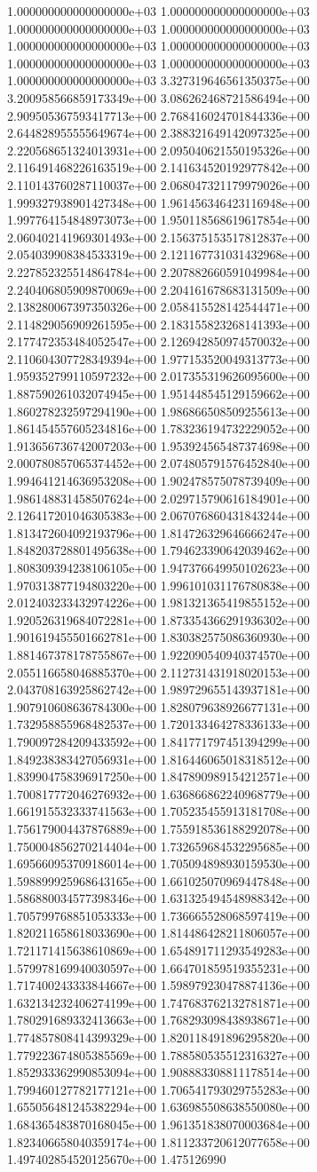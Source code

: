 1.000000000000000000e+03	1.000000000000000000e+03	1.000000000000000000e+03	1.000000000000000000e+03	1.000000000000000000e+03	1.000000000000000000e+03	1.000000000000000000e+03	1.000000000000000000e+03	1.000000000000000000e+03	3.327319646561350375e+00	3.200958566859173349e+00	3.086262468721586494e+00	2.909505367593417713e+00	2.768416024701844336e+00	2.644828955555649674e+00	2.388321649142097325e+00	2.220568651324013931e+00	2.095040621550195326e+00	2.116491468226163519e+00	2.141634520192977842e+00	2.110143760287110037e+00	2.068047321179979026e+00	1.999327938901427348e+00	1.961456346423116948e+00	1.997764154848973073e+00	1.950118568619617854e+00	2.060402141969301493e+00	2.156375153517812837e+00	2.054039908384533319e+00	2.121167731031432968e+00	2.227852325514864784e+00	2.207882660591049984e+00	2.240406805909870069e+00	2.204161678683131509e+00	2.138280067397350326e+00	2.058415528142544471e+00	2.114829056909261595e+00	2.183155823268141393e+00	2.177472353484052547e+00	2.126942850974570032e+00	2.110604307728349394e+00	1.977153520049313773e+00	1.959352799110597232e+00	2.017355319626095600e+00	1.887590261032074945e+00	1.951448545129159662e+00	1.860278232597294190e+00	1.986866508509255613e+00	1.861454557605234816e+00	1.783236194732229052e+00	1.913656736742007203e+00	1.953924565487374698e+00	2.000780857065374452e+00	2.074805791576452840e+00	1.994641214636953208e+00	1.902478575078739409e+00	1.986148831458507624e+00	2.029715790616184901e+00	2.126417201046305383e+00	2.067076860431843244e+00	1.813472604092193796e+00	1.814726329646666247e+00	1.848203728801495638e+00	1.794623390642039462e+00	1.808309394238106105e+00	1.947376649950102623e+00	1.970313877194803220e+00	1.996101031176780838e+00	2.012403233432974226e+00	1.981321365419855152e+00	1.920526319684072281e+00	1.873354366291936302e+00	1.901619455501662781e+00	1.830382575086360930e+00	1.881467378178755867e+00	1.922090540940374570e+00	2.055116658046885370e+00	2.112731431918020153e+00	2.043708163925862742e+00	1.989729655143937181e+00	1.907910608636784300e+00	1.828079638926677131e+00	1.732958855968482537e+00	1.720133464278336133e+00	1.790097284209433592e+00	1.841771797451394299e+00	1.849238383427056931e+00	1.816446065018318512e+00	1.839904758396917250e+00	1.847890989154212571e+00	1.700817772046276932e+00	1.636866862240968779e+00	1.661915532333741563e+00	1.705235455913181708e+00	1.756179004437876889e+00	1.755918536188292078e+00	1.750004856270214404e+00	1.732659684532295685e+00	1.695660953709186014e+00	1.705094898930159530e+00	1.598899925968643165e+00	1.661025070969447848e+00	1.586880034577398346e+00	1.631325494548988342e+00	1.705799768851053333e+00	1.736665528068597419e+00	1.820211658618033690e+00	1.814486428211806057e+00	1.721171415638610869e+00	1.654891711293549283e+00	1.579978169940030597e+00	1.664701859519355231e+00	1.717400243333844667e+00	1.598979230478874136e+00	1.632134232406274199e+00	1.747683762132781871e+00	1.780291689332413663e+00	1.768293098438938671e+00	1.774857808414399329e+00	1.820118491896295820e+00	1.779223674805385569e+00	1.788580535512316327e+00	1.852933362990853094e+00	1.908883308811178514e+00	1.799460127782177121e+00	1.706541793029755283e+00	1.655056481245382294e+00	1.636985508638550080e+00	1.684365483870168045e+00	1.961351838070003684e+00	1.823406658040359174e+00	1.811233720612077658e+00	1.497402854520125670e+00	1.475126990